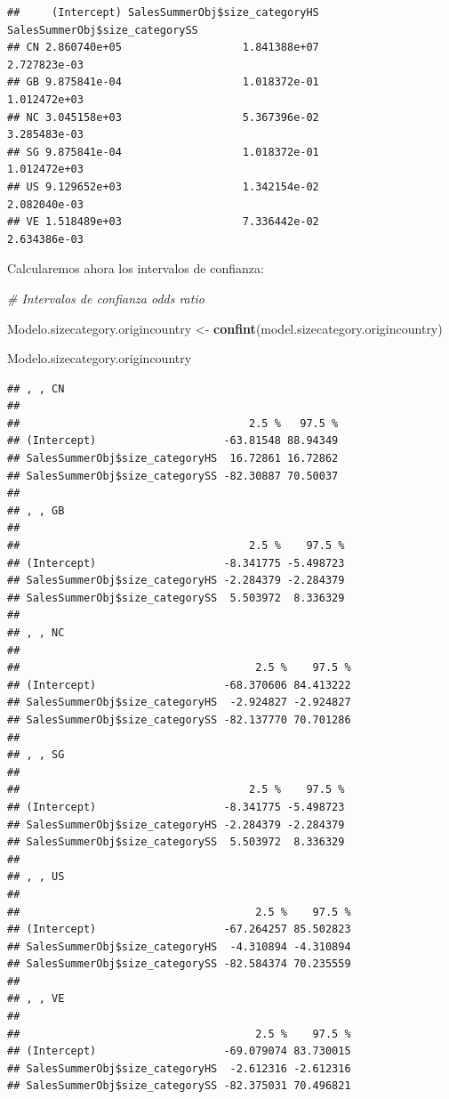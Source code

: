 \documentclass[
]{article}
\newenvironment{Shaded}{\begin{snugshade}}{\end{snugshade}}
\newcommand{\CommentTok}[1]{\textcolor[rgb]{0.56,0.35,0.01}{\textit{#1}}}
\newcommand{\KeywordTok}[1]{\textcolor[rgb]{0.13,0.29,0.53}{\textbf{#1}}}
\newcommand{\NormalTok}[1]{#1}
\newcommand{\StringTok}[1]{\textcolor[rgb]{0.31,0.60,0.02}{#1}}
\begin{document}
\begin{verbatim}
##     (Intercept) SalesSummerObj$size_categoryHS SalesSummerObj$size_categorySS
## CN 2.860740e+05                   1.841388e+07                   2.727823e-03
## GB 9.875841e-04                   1.018372e-01                   1.012472e+03
## NC 3.045158e+03                   5.367396e-02                   3.285483e-03
## SG 9.875841e-04                   1.018372e-01                   1.012472e+03
## US 9.129652e+03                   1.342154e-02                   2.082040e-03
## VE 1.518489e+03                   7.336442e-02                   2.634386e-03
\end{verbatim}

Calcularemos ahora los intervalos de confianza:

\begin{Shaded}
\begin{Highlighting}[]
\CommentTok{# Intervalos de confianza odds ratio}


\NormalTok{Modelo.sizecategory.origincountry <-}\StringTok{ }\KeywordTok{confint}\NormalTok{(model.sizecategory.origincountry)}

\NormalTok{Modelo.sizecategory.origincountry}
\end{Highlighting}
\end{Shaded}

\begin{verbatim}
## , , CN
## 
##                                    2.5 %   97.5 %
## (Intercept)                    -63.81548 88.94349
## SalesSummerObj$size_categoryHS  16.72861 16.72862
## SalesSummerObj$size_categorySS -82.30887 70.50037
## 
## , , GB
## 
##                                    2.5 %    97.5 %
## (Intercept)                    -8.341775 -5.498723
## SalesSummerObj$size_categoryHS -2.284379 -2.284379
## SalesSummerObj$size_categorySS  5.503972  8.336329
## 
## , , NC
## 
##                                     2.5 %    97.5 %
## (Intercept)                    -68.370606 84.413222
## SalesSummerObj$size_categoryHS  -2.924827 -2.924827
## SalesSummerObj$size_categorySS -82.137770 70.701286
## 
## , , SG
## 
##                                    2.5 %    97.5 %
## (Intercept)                    -8.341775 -5.498723
## SalesSummerObj$size_categoryHS -2.284379 -2.284379
## SalesSummerObj$size_categorySS  5.503972  8.336329
## 
## , , US
## 
##                                     2.5 %    97.5 %
## (Intercept)                    -67.264257 85.502823
## SalesSummerObj$size_categoryHS  -4.310894 -4.310894
## SalesSummerObj$size_categorySS -82.584374 70.235559
## 
## , , VE
## 
##                                     2.5 %    97.5 %
## (Intercept)                    -69.079074 83.730015
## SalesSummerObj$size_categoryHS  -2.612316 -2.612316
## SalesSummerObj$size_categorySS -82.375031 70.496821
\end{verbatim}
\end{document}
